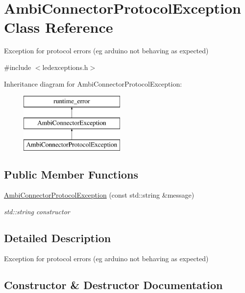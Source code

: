 \hypertarget{classAmbiConnectorProtocolException}{}\section{Ambi\+Connector\+Protocol\+Exception Class Reference}
\label{classAmbiConnectorProtocolException}


Exception for protocol errors (eg arduino not behaving as expected)  




{\ttfamily \#include $<$ledexceptions.\+h$>$}

Inheritance diagram for Ambi\+Connector\+Protocol\+Exception\+:\begin{figure}[H]
\begin{center}
\leavevmode
\includegraphics[height=3.000000cm]{classAmbiConnectorProtocolException}
\end{center}
\end{figure}
\subsection*{Public Member Functions}
\begin{DoxyCompactItemize}
\item 
\hyperlink{classAmbiConnectorProtocolException_a7f4fa656c11ddb28462e9441403433e7}{Ambi\+Connector\+Protocol\+Exception} (const std\+::string \&message)
\begin{DoxyCompactList}\small\item\em std\+::string constructor \end{DoxyCompactList}\end{DoxyCompactItemize}


\subsection{Detailed Description}
Exception for protocol errors (eg arduino not behaving as expected) 

\subsection{Constructor \& Destructor Documentation}
